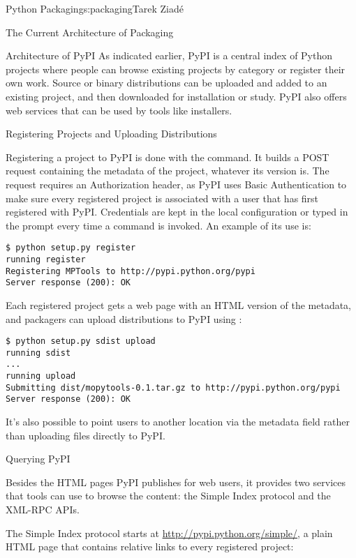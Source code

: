 \begin{aosachapter}{Python Packaging}{s:packaging}{Tarek Ziad\'{e}}
\begin{aosasect1}{The Current Architecture of Packaging}
\begin{aosasect2}{Architecture of PyPI}
As indicated earlier, PyPI is a central index of Python projects where
people can browse existing projects by category or register their own
work.  Source or binary distributions can be uploaded and added to an
existing project, and then downloaded for installation or study.  PyPI
also offers web services that can be used by tools like installers.

\begin{aosasect3}{Registering Projects and Uploading Distributions}

Registering a project to PyPI is done with the 
 command.  It builds a POST request containing the
metadata of the project, whatever its version is.  The request
requires an Authorization header, as PyPI uses Basic Authentication to
make sure every registered project is associated with a user that has
first registered with PyPI\@.  Credentials are kept in the local
 configuration or typed in the prompt every time a
 command is invoked.  An example of its use is:

\begin{verbatim}
$ python setup.py register
running register
Registering MPTools to http://pypi.python.org/pypi
Server response (200): OK
\end{verbatim}

\noindent Each registered project gets a web page with an HTML version of the
metadata, and packagers can upload distributions to PyPI using
:

\begin{verbatim}
$ python setup.py sdist upload
running sdist
...
running upload
Submitting dist/mopytools-0.1.tar.gz to http://pypi.python.org/pypi
Server response (200): OK
\end{verbatim}

It's also possible to point users to another location via the
 metadata field rather than uploading files directly to PyPI.

\end{aosasect3}

\begin{aosasect3}{Querying PyPI}

Besides the HTML pages PyPI publishes for web users, it provides two
services that tools can use to browse the content: the Simple Index
protocol and the XML-RPC APIs.

The Simple Index protocol starts at
\url{http://pypi.python.org/simple/}, a plain HTML page that contains
relative links to every registered project:


\end{aosasect3}
\end{aosasect2}
\end{aosasect1}
\end{aosachapter}
